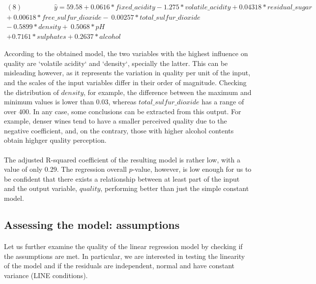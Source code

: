 \documentclass[10pt]{article}
\begin{document}
\begin{equation*}
\begin{aligned}	
(8) \ \ \ \  \ \ \ \ \ \ \ \ \ \ \ \ \ \ \ \ \  \hat{y} = 59.58 + 0.0616*fixed\_acidity  -1.275*volatile\_acidity 
+0.04318*residual\_sugar \\
+ \  0.00618*free\_sulfur\_dioxide  - \ 0.00257*total\_sulfur\_dioxide   
\\ - \ 0.5899*density  + \ 0.5068*pH   \\+ 0.7161*sulphates + 0.2637*alcohol
\end{aligned}
\end{equation*}

According to the obtained model, the two variables with the highest influence on quality are `volatile acidity` and `density`, specially the latter. This can be misleading however, as it represents the variation in quality per unit of the input, and the scales of the input variables differ in their order of magnitude. Checking the distribution of $density$, for example, the difference between the maximum and minimum values is lower than 0.03, whereas $total\_sulfur\_dioxide$ has a range of over 400. In any case, some conclusions can be extracted from this output. For example, denser wines tend to have a smaller perceived quality due to the negative coefficient, and, on the contrary, those with higher alcohol contents obtain highger quality perception.

\paragraph*{}
The adjusted R-squared coefficient of the resulting model is rather low, with a value of only 0.29. The regression overall $p$-value, however, is low enough for us to be confident that there exists a relationship between at least part of the input and the output variable, $quality$, performing better than just the simple constant model.

\subsection{Assessing the model: assumptions}

\paragraph*{}
Let us further examine the quality of the linear regression model by checking if the assumptions are met. In particular, we are interested in testing the linearity of the model and if the residuals are independent, normal and have constant variance (LINE conditions).
\end{document}
